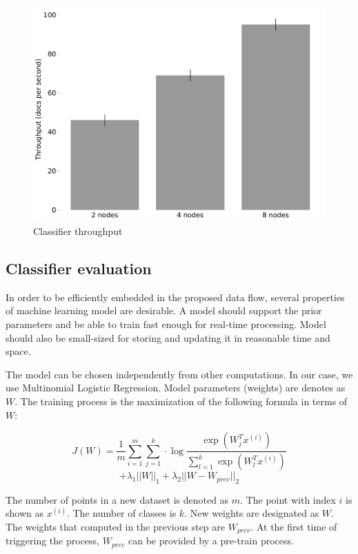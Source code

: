 \begin{figure}[htbp]
  \centering
  \includegraphics[scale=0.25]{pics/classifier_throughput}
  \caption{Classifier throughput}
  \label {throughput}
\end{figure}

\subsection{Classifier evaluation}

In order to be efficiently embedded in the proposed data flow, several properties of machine learning model are desirable. A model should support the prior parameters and be able to train fast enough for real-time processing. Model should also be small-sized for storing and updating it in reasonable time and space.

The model can be chosen independently from other computations. In our case, we use Multinomial Logistic Regression. Model parameters (weights) are denotes as $W$. The training process is the maximization of the following formula in terms of $W$:

\begin{center}

$$ J(W) = \frac{1}{m} \sum \limits_{i = 1}^{m} \sum \limits_{j = 1}^{k} \cdot \log \frac{\exp\left({W_{j}^Tx^{(i)}}\right) }{\sum \limits_{l = 1}^{k}  \exp\left({W_{l}^Tx^{(i)}}\right) }$$ 
 $$ +  \lambda_1 ||W||_1 + \lambda_2 ||W - W_{prev}||_2 $$

\end{center} 

The number of points in a new dataset is denoted as $m$. The point with index $i$ is shown as $x^{(i)}$. The number of classes is $k$. New weights are designated as $W$. The weights that computed in the previous step are $W_{prev}$. At the first time of triggering the process, $W_{prev}$ can be provided by a pre-train process.  

